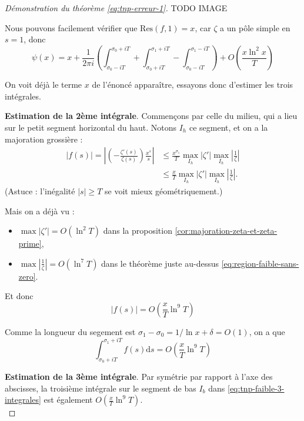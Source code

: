 \documentclass[french]{report}
\begin{document}
\begin{proof}[Démonstration du théorème \ref{eq:tnp-erreur-1}]
  TODO IMAGE

  Nous pouvons facilement vérifier que $\mathrm{Res}(f,1)=x$, car $\zeta$ a un pôle simple en $s=1$, donc
  \begin{equation}\label{eq:tnp-faible-3-integrales}
    \psi(x) = x +\frac{1}{2\pi i}\left(
      \int_{\sigma_0-iT}^{\sigma_0+iT}
      +\int_{\sigma_0+iT}^{\sigma_1+iT}
      -\int_{\sigma_0-iT}^{\sigma_1-iT}
    \right)
    +O\left(\frac{x\ln^2x}{T}\right)
  \end{equation}

  On voit déjà le terme $x$ de l'énoncé apparaître, essayons donc d'estimer les trois intégrales.
  
  \textbf{Estimation de la 2ème intégrale}. Commençons par celle du milieu, qui a lieu sur le petit segment horizontal du haut. Notons $I_h$ ce segment, et on a la majoration grossière :
  \begin{align*}
    |f(s)| = \left|\left(-\frac{\zeta'(s)}{\zeta(s)}\right)\frac{x^s}{s}\right| & \leq\frac{x^{\sigma_1}}{T}\max_{I_h}|\zeta'|\max_{I_h}\left|\frac{1}{\zeta}\right| \\
    & \leq\frac{x}{T}\max_{I_h}|\zeta'|\max_{I_h}\left|\frac{1}{\zeta}\right|.
  \end{align*}
  (Astuce : l'inégalité $|s|\geq T$ se voit mieux géométriquement.)

  Mais on a déjà vu :
  \begin{itemize}
    \item $\max|\zeta'| = O(\ln^2 T)$ dans la proposition \ref{cor:majoration-zeta-et-zeta-prime},
    \item $\max|\frac{1}{\zeta}| = O(\ln^7 T)$ dans le théorème juste au-dessus \ref{eq:region-faible-sans-zero}.
  \end{itemize}

  Et donc
  \[ |f(s)| = O\left(\frac{x}{T}\ln^9T\right) \]

  Comme la longueur du segement est $\sigma_1-\sigma_0=1/\ln x+\delta=O(1)$, on a que
  \begin{equation}\label{eq:tnp-faible-3-integrales-part1}
    \int_{\sigma_0+iT}^{\sigma_1+iT}f(s)\mathrm{d}s = O\left(\frac{x}{T}\ln^9T\right)
  \end{equation}

  \textbf{Estimation de la 3ème intégrale}. Par symétrie par rapport à l'axe des abscisses, la troisième intégrale sur le segment de bas $I_b$ dans \ref{eq:tnp-faible-3-integrales} est également $O\left(\frac{x}{T}\ln^9T\right)$.
  \\


\end{proof}
\end{document}
